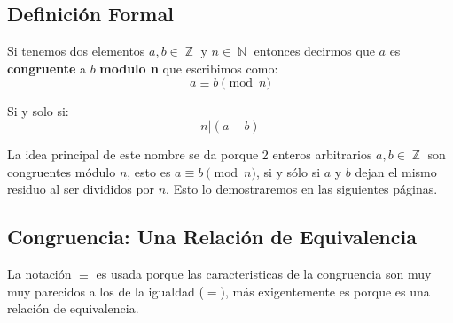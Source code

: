 \documentclass[12pt]{report}                                    %
\DeclareMathOperator \Naturals  {\mathbb{N}}                     %
\DeclareMathOperator \Integers  {\mathbb{Z}}                     %
\begin{document}
        \subsection*{Definición Formal}

            Si tenemos dos elementos $a, b \in \Integers$ y $n \in \Naturals$
            entonces decirmos que $a$ es \textbf{congruente} a $b$ \textbf{modulo n}
            que escribimos como:
            \begin{equation}
                a \equiv b \pmod{n}
            \end{equation}

            Si y solo si:
            \begin{equation}
                n | (a - b)
            \end{equation}


            La idea principal de este nombre se da porque 2 enteros arbitrarios
            $a,b \in \Integers$ son congruentes módulo $n$, esto es
            $a \equiv b \pmod{n}$, si y sólo si $a$ y $b$ dejan el mismo
            residuo al ser divididos por $n$. Esto lo demostraremos en las
            siguientes páginas.



        \clearpage
        \subsection{Congruencia: Una Relación de Equivalencia}

            La notación $\equiv$ es usada porque las caracteristicas de la
            congruencia son muy muy parecidos a los de la igualdad ($=$), 
            más exigentemente es porque es una relación de equivalencia.
\end{document}
